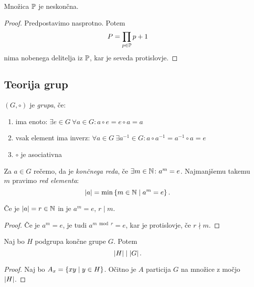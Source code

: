 \documentclass[12pt, a4paper]{article}
\begin{document}
\begin{izrek}
Množica $\P$ je neskončna.
\end{izrek}

\begin{proof}
Predpostavimo nasprotno. Potem
\[
P=\prod_{p\in\P} p + 1
\]
nima nobenega delitelja iz $\P$, kar je seveda protislovje.
\end{proof}

\newpage

\subsection{Teorija grup}

\begin{definicija}
$(G,\circ)$ je \emph{grupa}, če:

\begin{enumerate}
\item ima enoto: $\exists e\in G~\forall a\in G\colon a\circ e=e\circ a=a$
\item vsak element ima inverz: $\forall a\in G~\exists a^{-1}\in G\colon a\circ a^{-1}=a^{-1}\circ a=e$
\item $\circ$ je asociativna
\end{enumerate}
\end{definicija}

\begin{definicija}
Za $a\in G$ rečemo, da je \emph{končnega reda}, če $\exists m\in\N\colon a^m=e$. Najmanjšemu takemu $m$ pravimo \emph{red elementa}:
\[
\abs{a}=\min\set{m\in\N\mid a^m=e}.
\]
\end{definicija}

\begin{trditev}
Če je $\abs{a}=r\in\N$ in je $a^m=e$, $r\mid m$.
\end{trditev}

\begin{proof}
Če je $a^m=e$, je tudi  $a^{m\bmod r}=e$, kar je protislovje, če $r\nmid m$.
\end{proof}

\begin{izrek}[Lagrange]
Naj bo $H$ podgrupa končne grupe $G$. Potem
\[
\abs{H}\mid\abs{G}.
\]
\end{izrek}

\begin{proof}
Naj bo $A_x=\set{xy\mid y\in H}$. Očitno je $A$ particija $G$ na množice z močjo $\abs{H}$.
\end{proof}
\end{document}
